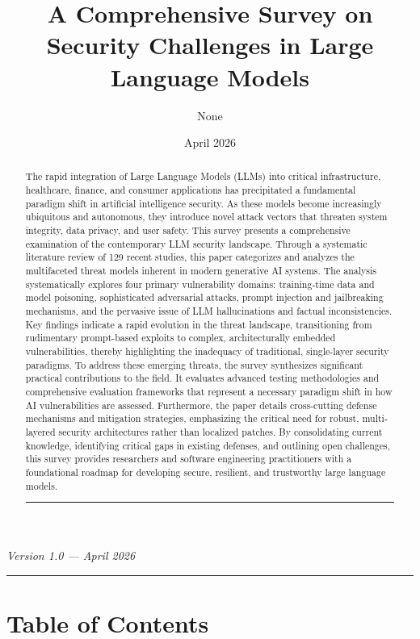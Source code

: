 \documentclass[11pt,a4paper]{article}
\title{A Comprehensive Survey on Security Challenges in Large Language Models}
\author{None}
\date{April 2026}
\begin{document}
\maketitle

\begin{abstract}
The rapid integration of Large Language Models (LLMs) into critical infrastructure, healthcare, finance, and consumer applications has precipitated a fundamental paradigm shift in artificial intelligence security. As these models become increasingly ubiquitous and autonomous, they introduce novel attack vectors that threaten system integrity, data privacy, and user safety. This survey presents a comprehensive examination of the contemporary LLM security landscape. Through a systematic literature review of 129 recent studies, this paper categorizes and analyzes the multifaceted threat models inherent in modern generative AI systems. The analysis systematically explores four primary vulnerability domains: training-time data and model poisoning, sophisticated adversarial attacks, prompt injection and jailbreaking mechanisms, and the pervasive issue of LLM hallucinations and factual inconsistencies. Key findings indicate a rapid evolution in the threat landscape, transitioning from rudimentary prompt-based exploits to complex, architecturally embedded vulnerabilities, thereby highlighting the inadequacy of traditional, single-layer security paradigms. To address these emerging threats, the survey synthesizes significant practical contributions to the field. It evaluates advanced testing methodologies and comprehensive evaluation frameworks that represent a necessary paradigm shift in how AI vulnerabilities are assessed. Furthermore, the paper details cross-cutting defense mechanisms and mitigation strategies, emphasizing the critical need for robust, multi-layered security architectures rather than localized patches. By consolidating current knowledge, identifying critical gaps in existing defenses, and outlining open challenges, this survey provides researchers and software engineering practitioners with a foundational roadmap for developing secure, resilient, and trustworthy large language models.

\noindent\rule{\textwidth}{0.4pt}
\end{abstract}


\textit{Version 1.0 --- April 2026}

\noindent\rule{\textwidth}{0.4pt}
\section{Table of Contents}
\end{document}
